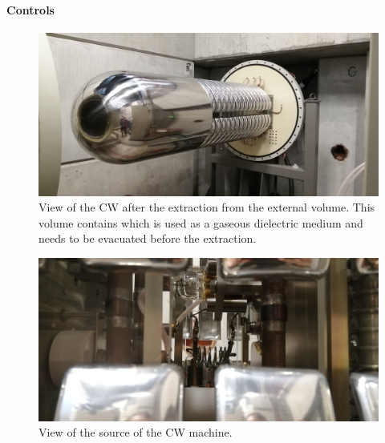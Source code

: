 \begin{refsection}
        \paragraph{Controls}

        \begin{figure}
            \centering
            \includegraphics[width=1\textwidth]{Figures/MEG/CW/view_front.jpg}
            \caption{View of the CW after the extraction from the external volume. This volume contains  which is used as a gaseous dielectric medium and needs to be evacuated before the extraction.}
            \label{fig:CW:view}
            \end{figure}

        \begin{figure}
            \centering
            \includegraphics[width=1\textwidth]{Figures/MEG/CW/view_source.jpg}
            \caption{View of the source of the CW   machine.}
            \label{fig:CW:view_source}
        \end{figure}


\end{refsection}
